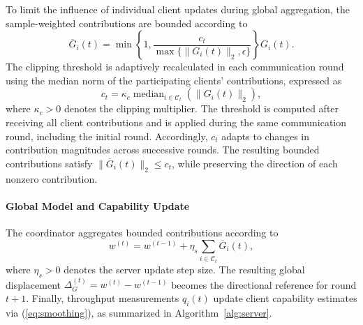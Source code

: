 \documentclass[conference]{IEEEtran}
\begin{document}
To limit the influence of individual client updates during global aggregation, the sample-weighted contributions are bounded according to
\begin{equation}
\overline G_i(t) =
\min\!\left\{
1,
\frac{c_t}{\max\{\|G_i(t)\|_2,\epsilon\}}
\right\}G_i(t).
\label{eq:clip}
\end{equation}
The clipping threshold is adaptively recalculated in each communication round using the median norm of the participating clients' contributions, expressed as
\begin{equation}
c_t = \kappa_c
\operatorname{median}_{i\in\mathcal{C}_t}
\left(\|G_i(t)\|_2\right),
\label{eq:calib}
\end{equation}
where $\kappa_c>0$ denotes the clipping multiplier. The threshold is computed after receiving all client contributions and is applied during the same communication round, including the initial round. Accordingly, $c_t$ adapts to changes in contribution magnitudes across successive rounds. The resulting bounded contributions satisfy $\|\overline G_i(t)\|_2\le c_t$, while preserving the direction of each nonzero contribution.

\paragraph{Global Model and Capability Update}
The coordinator aggregates bounded contributions according to
\begin{equation}
w^{(t)} = w^{(t-1)} + \eta_s \sum_{i \in \mathcal{C}_t} \overline G_i(t),
\label{eq:aggregation}
\end{equation}
where $\eta_s>0$ denotes the server update step size. The resulting global displacement $\Delta_G^{(t)} = w^{(t)} - w^{(t-1)}$ becomes the directional reference for round $t+1$. Finally, throughput measurements $q_i(t)$ update client capability estimates via (\ref{eq:smoothing}), as summarized in Algorithm~\ref{alg:server}.
\end{document}
